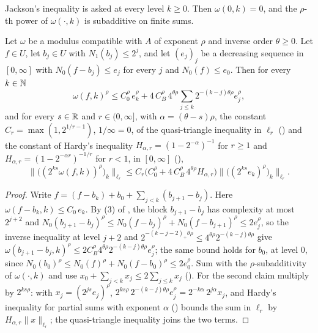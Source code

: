 Jackson's inequality is asked at every level $k \geq 0$. Then $\omega(0, k) = 0$, and the
$\rho$-th power of $\omega(\cdot, k)$ is subadditive on finite sums.

\begin{lemma}
\label{lem:couple-modulus-telescoping}
\leanok
{}
Let $\omega$ be a modulus compatible with $A$ of exponent $\rho$ and inverse order
$\theta \geq 0$. Let $f \in U$, let $b_j \in U$ with $N_1(b_j) \leq 2^j$, and let $(e_j)_j$ be
a decreasing sequence in $[0, \infty]$ with $N_0(f - b_j) \leq e_j$ for every $j$ and
$N_0(f) \leq e_0$. Then for every $k \in \mathbb{N}$
\[
  \omega(f, k)^\rho \leq C_0^\rho \, e_k^\rho + 4 \, C_B^\rho \, 4^{\theta\rho}
  \sum_{j \leq k} 2^{-(k - j)\theta\rho} e_j^\rho ,
\]
and for every $s \in \mathbb{R}$ and $r \in (0, \infty]$, with $\alpha = (\theta - s)\rho$, the
constant $C_r = \max(1, 2^{1/r - 1})$, $1/\infty = 0$, of the quasi-triangle inequality in
$\ell_r$ () and the constant of Hardy's inequality
$H_{\alpha, r} = (1 - 2^{-\alpha})^{-1}$ for $r \geq 1$ and
$H_{\alpha, r} = (1 - 2^{-\alpha r})^{-1/r}$ for $r < 1$, in $[0, \infty]$
(),
\[
  \bigl\| \bigl( (2^{ks} \omega(f, k))^\rho \bigr)_k \bigr\|_{\ell_r} \leq
  C_r \bigl(C_0^\rho + 4 \, C_B^\rho \, 4^{\theta\rho} H_{\alpha, r}\bigr)
  \bigl\| \bigl( (2^{ks} e_k)^\rho \bigr)_k \bigr\|_{\ell_r} .
\]
\end{lemma}

\begin{proof}
\leanok
{}
Write $f = (f - b_k) + b_0 + \sum_{j < k} (b_{j+1} - b_j)$. Here
$\omega(f - b_k, k) \leq C_0 \, e_k$. By (3) of , the block
$b_{j+1} - b_j$ has complexity at most $2^{j+2}$ and
$N_0(b_{j+1} - b_j)^\rho \leq N_0(f - b_j)^\rho + N_0(f - b_{j+1})^\rho \leq 2 e_j^\rho$, so the
inverse inequality at level $j + 2$ and $2^{-(k - j - 2)_+\theta\rho} \leq
4^{\theta\rho} 2^{-(k - j)\theta\rho}$ give
$\omega(b_{j+1} - b_j, k)^\rho \leq 2 C_B^\rho 4^{\theta\rho} 2^{-(k - j)\theta\rho} e_j^\rho$;
the same bound holds for $b_0$, at level $0$, since $N_0(b_0)^\rho \leq N_0(f)^\rho +
N_0(f - b_0)^\rho \leq 2 e_0^\rho$. Sum with the $\rho$-subadditivity of $\omega(\cdot, k)$ and
use $x_0 + \sum_{j < k} x_j \leq 2 \sum_{j \leq k} x_j$
(). For the second claim multiply by
$2^{ks\rho}$: with $x_j = (2^{js} e_j)^\rho$,
$2^{ks\rho} \, 2^{-(k - j)\theta\rho} e_j^\rho = 2^{-k\alpha} \, 2^{j\alpha} x_j$, and Hardy's
inequality for partial sums with exponent $\alpha$ () bounds the
sum in $\ell_r$ by $H_{\alpha, r} \|x\|_{\ell_r}$; the quasi-triangle inequality joins the two
terms.
\end{proof}


